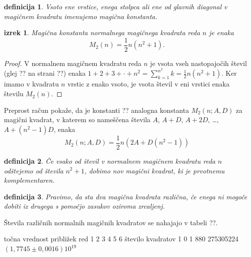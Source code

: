\documentclass[a4paper,12pt]{article}
\newtheorem{Definicija}{definicija}}
\newtheorem{Izrek}{izrek}}
\begin{document}
\begin{Definicija}
      Vsoto ene vrstice, enega stolpca ali ene od glavnih diagonal
      v magičnem kvadratu imenujemo \emph{magična konstanta}.
\end{Definicija}

\begin{Izrek}
   Magična konstanta normalnega magičnega kvadrata reda \(n\)
   je enaka
   \begin{equation}
      M_2(n) = \frac{1}{2} n (n^2+1).
   \end{equation}
\end{Izrek}

\begin{proof}
   V normalnem magičnem kvadratu reda \(n\) je vsota vseh nastopajočih
   števil (glej ?? na strani ??) enaka
   \(1 + 2 + 3 + \cdot + {n^2} = \sum_{k=1}^{n^2} k = \frac{1}{2} n (n^2+1)\).
   Ker imamo
   v kvadratu \(n\) vrstic z enako vsoto, je vsota števil v eni vrstici
   enaka številu \(M_2(n)\). %
\end{proof}

Preprost račun pokaže, da je konstanti ?? analogna konstanta
\(M_2(n;A,D)\) za magični kvadrat, v katerem so nameščena števila
\(A\), \(A+D\), \(A+2D\), \ldots, \(A+(n^2-1)D\), enaka %
\begin{equation}
   M_2(n;A,D) = \frac{1}{2} n (2A + D(n^2-1))
\end{equation}

\begin{Definicija}
      Če vsako od števil v normalnem magičnem kvadratu reda \(n\) odštejemo
      od števila \(n^2 + 1\), dobimo nov magični kvadrat, ki je prvotnemu
      \emph{komplementaren}.
\end{Definicija}

\begin{Definicija}
      Pravimo, da sta dva magična kvadrata \emph{različna}, če enega ni mogoče dobiti
      iz drugega s pomočjo zasukov oziroma zrcaljenj.
\end{Definicija}

Števila različnih normalnih magičnih kvadratov se nahajajo v tabeli ??.

      točna vrednost približek
      red 1 2 3 4 5 6
        število kvadratov 1 0 1 880 275305224 \((1{,}7745\pm 0{,}0016)10^{19}\)
\end{document}
